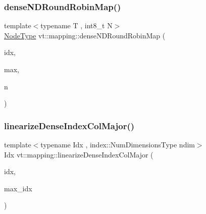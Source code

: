 \subsubsection{\texorpdfstring{dense\+N\+D\+Round\+Robin\+Map()}{denseNDRoundRobinMap()}}
{\footnotesize\ttfamily template$<$typename T , int8\+\_\+t N$>$ \\
\hyperlink{namespacevt_a866da9d0efc19c0a1ce79e9e492f47e2}{Node\+Type} vt\+::mapping\+::dense\+N\+D\+Round\+Robin\+Map (\begin{DoxyParamCaption}\item[{\hyperlink{namespacevt_1_1mapping_ab77f5302cd346d499e48a8c796043746}{Idx\+N\+D\+Ptr}$<$ T, N $>$}]{idx,  }\item[{\hyperlink{namespacevt_1_1mapping_ab77f5302cd346d499e48a8c796043746}{Idx\+N\+D\+Ptr}$<$ T, N $>$}]{max,  }\item[{\hyperlink{namespacevt_a866da9d0efc19c0a1ce79e9e492f47e2}{Node\+Type}}]{n }\end{DoxyParamCaption})}

\mbox{\label{namespacevt_1_1mapping_a4dd58859e65edd3145fc52392161c90a}} 
\subsubsection{\texorpdfstring{linearize\+Dense\+Index\+Col\+Major()}{linearizeDenseIndexColMajor()}}
{\footnotesize\ttfamily template$<$typename Idx , index\+::\+Num\+Dimensions\+Type ndim$>$ \\
Idx vt\+::mapping\+::linearize\+Dense\+Index\+Col\+Major (\begin{DoxyParamCaption}\item[{\hyperlink{namespacevt_ac016d9c31465ce11c14eab2be11f9183}{Dense\+Index}$<$ Idx, ndim $>$ $\ast$}]{idx,  }\item[{\hyperlink{namespacevt_ac016d9c31465ce11c14eab2be11f9183}{Dense\+Index}$<$ Idx, ndim $>$ $\ast$}]{max\+\_\+idx }\end{DoxyParamCaption})}

\mbox{\label{namespacevt_1_1mapping_abcd5f8f5e5c974ef83eaa87eeeb416a6}} 
